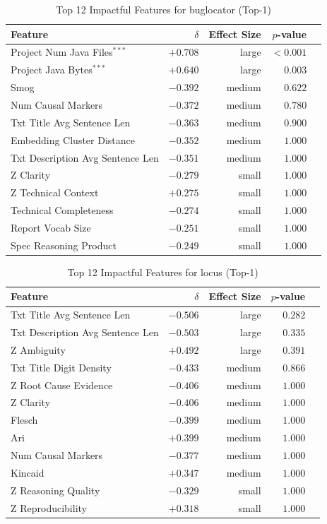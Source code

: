 \begin{table}[h]
\centering
\caption{Top 12 Impactful Features for buglocator (Top-1)}
\label{tab:tool_features_buglocator_top1}
\begin{tabular}{lrrrr}
\toprule
Feature & $\delta$ & Effect Size & $p$-value \\
\midrule
Project Num Java Files$^{***}$ & $+0.708$ & large & $<0.001$ \\
Project Java Bytes$^{***}$ & $+0.640$ & large & $0.003$ \\
Smog & $-0.392$ & medium & $0.622$ \\
Num Causal Markers & $-0.372$ & medium & $0.780$ \\
Txt Title Avg Sentence Len & $-0.363$ & medium & $0.900$ \\
Embedding Cluster Distance & $-0.352$ & medium & $1.000$ \\
Txt Description Avg Sentence Len & $-0.351$ & medium & $1.000$ \\
Z Clarity & $-0.279$ & small & $1.000$ \\
Z Technical Context & $+0.275$ & small & $1.000$ \\
Technical Completeness & $-0.274$ & small & $1.000$ \\
Report Vocab Size & $-0.251$ & small & $1.000$ \\
Spec Reasoning Product & $-0.249$ & small & $1.000$ \\
\bottomrule
\end{tabular}
\end{table}

\begin{table}[h]
\centering
\caption{Top 12 Impactful Features for locus (Top-1)}
\label{tab:tool_features_locus_top1}
\begin{tabular}{lrrrr}
\toprule
Feature & $\delta$ & Effect Size & $p$-value \\
\midrule
Txt Title Avg Sentence Len & $-0.506$ & large & $0.282$ \\
Txt Description Avg Sentence Len & $-0.503$ & large & $0.335$ \\
Z Ambiguity & $+0.492$ & large & $0.391$ \\
Txt Title Digit Density & $-0.433$ & medium & $0.866$ \\
Z Root Cause Evidence & $-0.406$ & medium & $1.000$ \\
Z Clarity & $-0.406$ & medium & $1.000$ \\
Flesch & $-0.399$ & medium & $1.000$ \\
Ari & $+0.399$ & medium & $1.000$ \\
Num Causal Markers & $-0.377$ & medium & $1.000$ \\
Kincaid & $+0.347$ & medium & $1.000$ \\
Z Reasoning Quality & $-0.329$ & small & $1.000$ \\
Z Reproducibility & $+0.318$ & small & $1.000$ \\
\bottomrule
\end{tabular}
\end{table}
